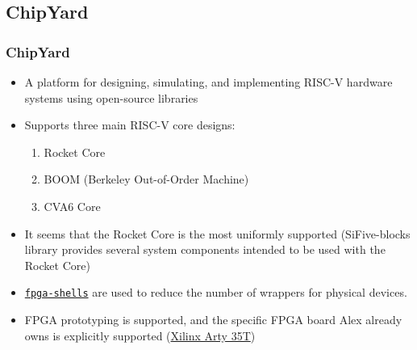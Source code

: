 \documentclass{weeklyslides}
\begin{document}
\subsection{ChipYard}\label{subsec:ChipYard}
\begin{frame}
  \frametitle{ChipYard~\cite{chipyard}}
  \begin{itemize}
  \item A platform for designing, simulating, and implementing RISC-V hardware systems using open-source libraries
  \item Supports three main RISC-V core designs:
    \begin{enumerate}
    \item Rocket Core
    \item BOOM (Berkeley Out-of-Order Machine)
    \item CVA6 Core
    \end{enumerate}
  \item It seems that the Rocket Core is the most uniformly supported (SiFive-blocks library provides several system components intended to be used with the Rocket Core)
  \item \href{https://github.com/sifive/fpga-shells}{\texttt{fpga-shells}} are used to reduce the number of wrappers for physical devices.
  \item FPGA prototyping is supported, and the specific FPGA board Alex already owns is explicitly supported (\href{https://www.xilinx.com/products/boards-and-kits/arty.html}{Xilinx Arty 35T})
  \end{itemize}

\end{frame}
\end{document}
